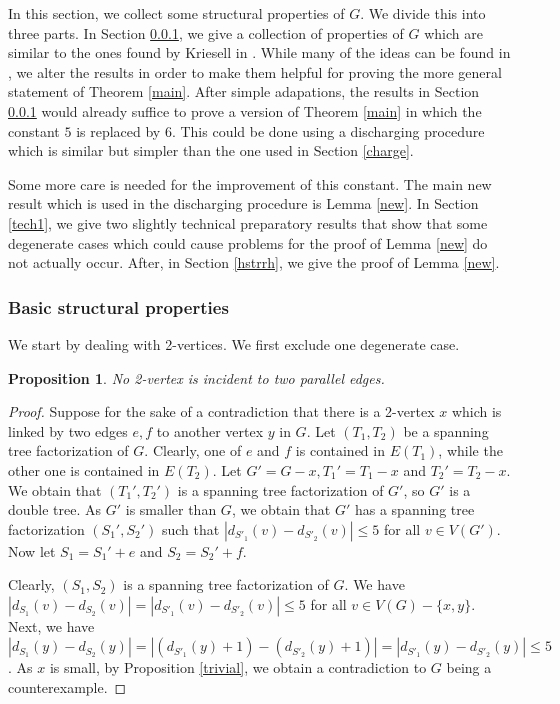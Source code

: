 \documentclass{article}
\theoremstyle{plain}
\newtheorem{Proposition}{Proposition}
\theoremstyle{nonumberplain}
\theoremstyle{nonumberplain}
\newcommand{\stf}{spanning tree factorization }
\begin{document}
In this section, we collect some structural properties of $G$. We divide this into three parts. In Section \ref{base}, we give a collection of properties of $G$ which are similar to the ones found by Kriesell in \cite{nk1}. While many of the ideas can be found in \cite{nk1}, we alter the results in order to make them helpful for proving the more general statement of Theorem \ref{main}. After simple adapations, the results in Section \ref{base} would already suffice to prove a version of Theorem \ref{main} in which the constant $5$ is replaced by $6$. This could be done using a discharging procedure which is similar but simpler than the one used in Section \ref{charge}.

Some more care is needed for the improvement of this constant. The main new result which is used in the discharging procedure is Lemma \ref{new}. In Section \ref{tech1}, we give two slightly technical preparatory results that show that some degenerate cases which could cause problems for the proof of Lemma \ref{new} do not actually occur. After, in Section \ref{hstrrh}, we give the proof of Lemma \ref{new}.
\subsubsection{Basic structural properties}\label{base}
We start by dealing with 2-vertices. We first exclude one degenerate case.

\begin{Proposition}\label{dz}
No 2-vertex is incident to two parallel edges.
\end{Proposition}
\begin{proof}
Suppose for the sake of a contradiction that there is a 2-vertex $x$ which is linked by two edges $e,f$ to another vertex $y$ in $G$. Let $(T_1,T_2)$ be a \stf of $G$. Clearly, one of $e$ and $f$ is contained in $E(T_1)$, while the other one is contained in $E(T_2)$. Let $G'=G-x, T_1'=T_1-x$  and $T_2'=T_2-x$. We obtain that $(T_1',T_2')$ is a \stf of $G'$, so $G'$ is a double tree. As $G'$ is smaller than $G$, we obtain that $G'$ has a \stf $(S_1',S_2')$ such that $|d_{S'_1}(v)-d_{S'_2}(v)|\leq 5$ for all $v \in V(G')$. Now let $S_1=S_1'+e$ and $S_2=S_2'+f$.

 Clearly, $(S_1,S_2)$ is a \stf of $G$. We have $|d_{S_1}(v)-d_{S_2}(v)|=|d_{S'_1}(v)-d_{S'_2}(v)|\leq 5$ for all $v \in V(G)-\{x,y\}$. Next, we have $|d_{S_1}(y)-d_{S_2}(y)|=|(d_{S'_1}(y)+1)-(d_{S'_2}(y)+1)|=|d_{S'_1}(y)-d_{S'_2}(y)|\leq 5$. As $x$ is small, by Proposition \ref{trivial}, we obtain a contradiction to $G$ being a counterexample.
\end{proof}
\end{document}
